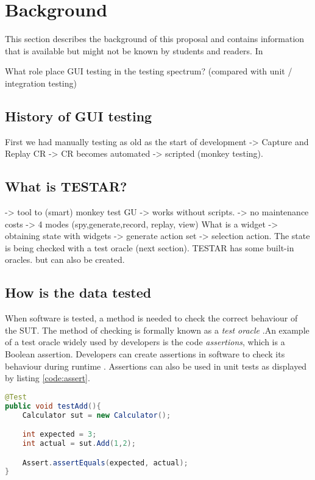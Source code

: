 \section{Background} \label{background}
    This section describes the background of this proposal and contains information that is available but might not be known by students and readers. In
    
    What role place GUI testing in the testing spectrum? (compared with unit / integration testing)

\subsection{History of GUI testing}


    First we had manually testing as old as the start of development -> Capture and Replay CR -> CR becomes automated -> scripted (monkey testing).

\subsection{What is TESTAR?}
    -> tool to (smart) monkey test GU -> works without scripts. -> no maintenance costs -> 4 modes (spy,generate,record, replay, view)
    What is a widget -> obtaining state with widgets -> generate action set -> selection action.
    The state is being checked with a test oracle (next section). TESTAR has some built-in oracles. but can also be created.



\subsection{How is the data tested}
    When software is tested, a method is needed to check the correct behaviour of the SUT. The method of checking is formally known as a \emph{test oracle} \cite{testOracles}.An example of a test oracle widely used by developers is the code \emph{assertions}, which is a Boolean assertion. Developers can create assertions in software to check its behaviour during runtime \cite{barr2014oracle}. Assertions can also be used in unit tests as displayed by listing \ref{code:assert}. 

\begin{lstlisting}[language=Java, caption=Assertion, label=code:assert]
@Test
public void testAdd(){
    Calculator sut = new Calculator();

    int expected = 3;
    int actual = sut.Add(1,2);

    Assert.assertEquals(expected, actual);
}
\end{lstlisting}

